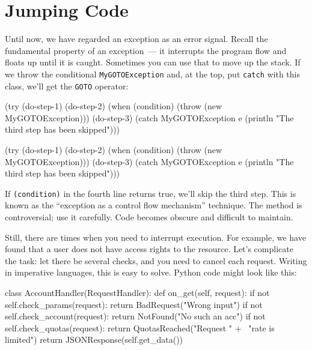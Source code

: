 \section{Jumping Code}


Until now, we have regarded an exception as an error signal. Recall the fundamental property of an exception~--- it interrupts the program flow and floats up until it is caught. Sometimes you can use that to move up the stack. If we throw the conditional \verb|MyGOTOException| and, at the top, put \verb|catch| with this class, we'll get the \verb|GOTO| operator:

\ifx\DEVICETYPE\MOBILE

\begin{clojure/lines}
(try
  (do-step-1)
  (do-step-2)
  (when (condition)
    (throw (new MyGOTOException)))
  (do-step-3)
  (catch MyGOTOException e
    (println "The third step
                  has been skipped")))
\end{clojure/lines}

\else

\begin{clojure/lines}
(try
  (do-step-1)
  (do-step-2)
  (when (condition)
    (throw (new MyGOTOException)))
  (do-step-3)
  (catch MyGOTOException e
    (println "The third step has been skipped")))
\end{clojure/lines}

\fi

If \verb|(condition)| in the fourth line returns true, we'll skip the third
step. This is known as the ``exception as a control flow mechanism''
technique. The method is controversial; use it carefully. Code becomes obscure
and difficult to maintain.


Still, there are times when you need to interrupt execution. For example, we have found that a user does not have access rights to the resource. Let's complicate the task: let there be several checks, and you need to cancel each request.
Writing in imperative languages, this is easy to solve. Python code might look like this:


\ifx\DEVICETYPE\MOBILE

\begin{python}
class AccountHandler(RequestHandler):
  def on_get(self, request):
    if not self.check_params(request):
      return BadRequest("Wrong input")
    if not self.check_account(request):
      return NotFound("No such an acc")
    if not self.check_quotas(request):
      return QuotasReached("Request " + \
             "rate is limited")
    return JSONResponse(self.get_data())
\end{python}

